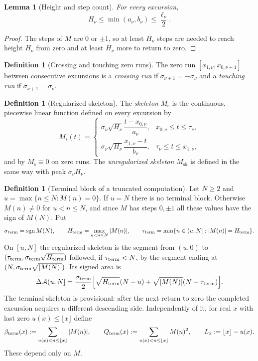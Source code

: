\documentclass[11pt]{amsart}
\numberwithin{equation}{section}
\theoremstyle{plain}
\newtheorem{lemma}[theorem]{Lemma}
\theoremstyle{definition}
\newtheorem{definition}[theorem]{Definition}
\theoremstyle{remark}
\DeclareMathOperator{\sgn}{sgn}
\newcommand{\Ms}{M_{\mathrm{s}}}
\newcommand{\Msk}{M_{\mathrm{sk}}}
\newcommand{\Anet}{\mathcal{A}}
\begin{document}
\begin{lemma}[Height and step count]
\label{lem:height_steps}
For every excursion,
\begin{equation}
\label{eq:height_steps}
H_\nu\le\min(a_\nu,b_\nu)\le\frac{\ell_\nu}{2}.
\end{equation}
\end{lemma}

\begin{proof}
The steps of $M$ are $0$ or $\pm1$, so at least $H_\nu$ steps are needed to
reach height $H_\nu$ from zero and at least $H_\nu$ more to return to zero.
\end{proof}

\begin{definition}[Crossing and touching zero runs]
\label{def:crossing_touching}
The zero run $[x_{1,\nu},x_{0,\nu+1}]$ between consecutive excursions is a
\emph{crossing run} if $\sigma_{\nu+1}=-\sigma_\nu$ and a \emph{touching run}
if $\sigma_{\nu+1}=\sigma_\nu$.
\end{definition}

\begin{definition}[Regularized skeleton]
\label{def:Ms}
The \emph{skeleton} $\Ms$ is the continuous, piecewise linear function
defined on every excursion by
\begin{equation}
\label{eq:Ms_def}
\Ms(t)=
\begin{cases}
\sigma_\nu\sqrt{H_\nu}\dfrac{t-x_{0,\nu}}{a_\nu},
 &x_{0,\nu}\le t\le\tau_\nu,\\[2ex]
\sigma_\nu\sqrt{H_\nu}\dfrac{x_{1,\nu}-t}{b_\nu},
 &\tau_\nu\le t\le x_{1,\nu},
\end{cases}
\end{equation}
and by $\Ms\equiv0$ on zero runs. The \emph{unregularized skeleton} $\Msk$
is defined in the same way with peak $\sigma_\nu H_\nu$.
\end{definition}

\begin{definition}[Terminal block of a truncated computation]
\label{def:Ms-terminal}
Let $N\ge2$ and $u=\max\{n\le N:M(n)=0\}$. If $u=N$ there is no terminal
block. Otherwise $M(n)\ne0$ for $u<n\le N$, and since $M$ has steps
$0,\pm1$ all these values have the sign of $M(N)$. Put
\[
\sigma_{\rm term}=\sgn M(N),\qquad
H_{\rm term}=\max_{u<n\le N}|M(n)|,\qquad
\tau_{\rm term}=\min\{n\in(u,N]:|M(n)|=H_{\rm term}\}.
\]
On $[u,N]$ the regularized skeleton is the segment from $(u,0)$ to
$(\tau_{\rm term},\sigma_{\rm term}\sqrt{H_{\rm term}})$ followed, if
$\tau_{\rm term}<N$, by the segment ending at
$(N,\sigma_{\rm term}\sqrt{|M(N)|})$. Its signed area is
\[
\Delta\Anet(u,N]=\frac{\sigma_{\rm term}}2
\Bigl[\sqrt{H_{\rm term}}(N-u)+
\sqrt{|M(N)|}(N-\tau_{\rm term})\Bigr].
\]
The terminal skeleton is provisional: after the next return to zero the
completed excursion acquires a different descending side. Independently of
it, for real $x$ with last zero $u(x)\le\lfloor x\rfloor$ define
\[
\beta_{\rm term}(x):=\sum_{u(x)<n\le\lfloor x\rfloor}|M(n)|,\qquad
Q_{\rm term}(x):=\sum_{u(x)<n\le\lfloor x\rfloor}M(n)^2,\qquad
L_x:=\lfloor x\rfloor-u(x).
\]
These depend only on $M$.
\end{definition}
\end{document}
